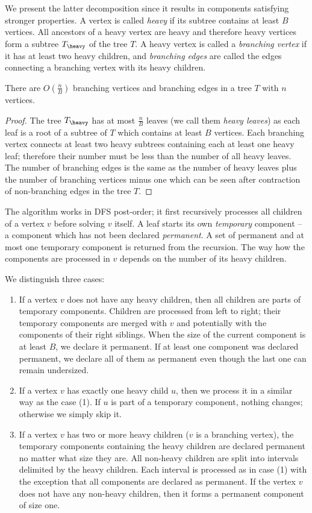 We present the latter decomposition since it results in components satisfying stronger properties.
A vertex is called \emph{heavy} if its subtree contains at least $B$ vertices.
All ancestors of a heavy vertex are heavy and therefore heavy vertices form a subtree $T_{\heavy}$ of the tree $T$.
A heavy vertex is called a \emph{branching vertex} if it has at least two heavy children, and \emph{branching edges} are called the edges connecting a branching vertex with its heavy children.

\begin{lemma}\label{l:no-branching}
	There are $O\left(\frac{n}{B}\right)$ branching vertices and branching edges in a tree $T$ with $n$ vertices.
\end{lemma}
\begin{proof}
	The tree $T_{\heavy}$ has at most $\frac{n}{B}$ leaves (we call them \emph{heavy leaves}) as each leaf is a root of a subtree of $T$ which contains at least $B$ vertices.
	Each branching vertex connects at least two heavy subtrees containing each at least one heavy leaf; therefore their number must be less than the number of all heavy leaves.
	The number of branching edges is the same as the number of heavy leaves plus the number of branching vertices minus one which can be seen after contraction of non-branching edges in the tree $T$.
\end{proof}

The algorithm works in DFS post-order; it first recursively processes all children of a vertex $v$ before solving $v$ itself.
A leaf starts its own \emph{temporary} component -- a component which has not been declared \emph{permanent}.
A set of permanent and at most one temporary component is returned from the recursion.
The way how the components are processed in $v$ depends on the number of its heavy children.

We distinguish three cases:
\begin{enumerate}
	\item If a vertex $v$ does not have any heavy children, then all children are parts of temporary components.
	Children are processed from left to right; their temporary components are merged with $v$ and potentially with the components of their right siblings.
	When the size of the current component is at least $B$, we declare it permanent.
	If at least one component was declared permanent, we declare all of them as permanent even though the last one can remain undersized.
	\item If a vertex $v$ has exactly one heavy child $u$, then we process it in a similar way as the case (1).
	If $u$ is part of a temporary component, nothing changes; otherwise we simply skip it.
	\item If a vertex $v$ has two or more heavy children ($v$ is a branching vertex), the temporary components containing the heavy children are declared permanent no matter what size they are.
	All non-heavy children are split into intervals delimited by the heavy children.
	Each interval is processed as in case (1) with the exception that all components are declared as permanent.
	If the vertex $v$ does not have any non-heavy children, then it forms a permanent component of size one.
\end{enumerate}

